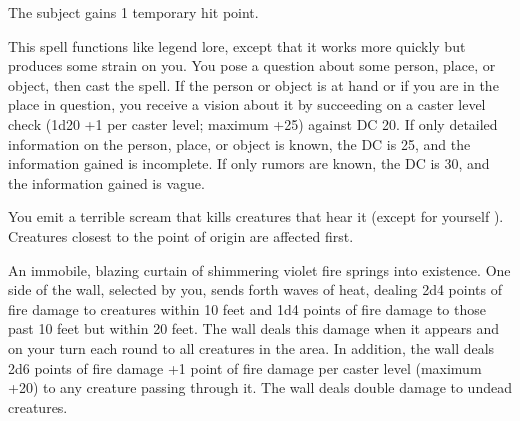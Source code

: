 \begin{multicols}{2}
\begin{small}

\noindent The subject gains 1 temporary hit point.

\noindent This spell functions like legend lore, except that it works more quickly but produces some strain on you. You pose a question about some person, place, or object, then cast the spell. If the person or object is at hand or if you are in the place in question, you receive a vision about it by succeeding on a caster level check (1d20 +1 per caster level; maximum +25) against DC 20. If only detailed information on the person, place, or object is known, the DC is 25, and the information gained is incomplete. If only rumors are known, the DC is 30, and the information gained is vague.


\noindent You emit a terrible scream that kills creatures that hear it (except for yourself ). Creatures closest to the point of origin are affected first.

\noindent An immobile, blazing curtain of shimmering violet fire springs into existence. One side of the wall, selected by you, sends forth waves of heat, dealing 2d4 points of fire damage to creatures within 10 feet and 1d4 points of fire damage to those past 10 feet but within 20 feet. The wall deals this damage when it appears and on your turn each round to all creatures in the area. In addition, the wall deals 2d6 points of fire damage +1 point of fire damage per caster level (maximum +20) to any creature passing through it. The wall deals double damage to undead creatures.


\end{small}
\end{multicols}
